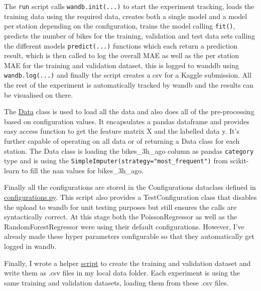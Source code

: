\documentclass[a4paper]{article}
\begin{document}
    The \texttt{run} script calls \texttt{wandb.init(...)} to start the experiment tracking, loads the training data using the required data,
    creates both a single model and a model per station depending on the configuration, trains the model calling \texttt{fit()},
    predicts the number of bikes for the training, validation and test data sets calling the different models \texttt{predict(...)}
    functions which each return a prediction result, which is then called to log the overall MAE as well as the per
    station MAE for the training and validation dataset, this is logged to wanddb using \texttt{wandb.log(...)} and finally
    the script creates a csv for a Kaggle submission. All the rest of the experiment is automatically tracked by wandb
    and the results can be visualised on there.

    The \href{https://github.com/isabelladegen/mlp-2021/blob/c48d85dc364b5a2e7e59f16961b32f9e6c245735/src/Data.py}{Data} class
    is used to load all the data and also does all of the pre-processing based on configuration values. It encapsulates
    a pandas dataframe and provides easy access function to get the feature matrix X and the labelled data y. It's further
    capable of operating on all data or of returning a Data class for each station. The Data class is loading the
    bikes\_3h\_ago column as pandas \texttt{category} type and is using the
    \texttt{SimpleImputer(strategy="most\_frequent")} from scikit-learn to fill the nan values for bikes\_3h\_ago.

    Finally all the configurations are stored in the Configurations dataclass defined in
    \href{https://github.com/isabelladegen/mlp-2021/blob/c48d85dc364b5a2e7e59f16961b32f9e6c245735/src/configurations.py}{configurations.py}.
    This script also provides a TestConfiguration class that disables the upload to wandb for unit testing purposes but
    still ensures the calls are syntactically correct. At this stage both the PoissonRegressor as well as the RandomForestRegressor
    were using their default configurations. However,
    I've already made these hyper parameters configurable so that they automatically get logged in wandb.

    Finally, I wrote a helper \href{https://github.com/isabelladegen/mlp-2021/blob/c48d85dc364b5a2e7e59f16961b32f9e6c245735/src/create_dev_and_validation_csv.py}{script}
    to create the training and validation dataset and write them as .csv files in my local
    data folder. Each experiment is using the same training and validation datasets, loading them from these .csv files.
\end{document}
